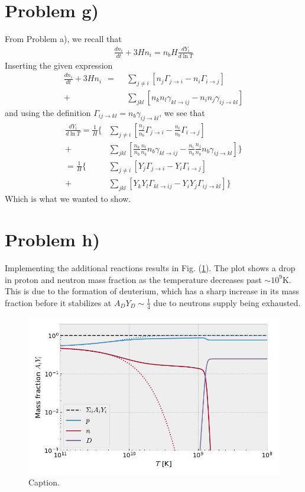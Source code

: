 \documentclass[reprint,english,notitlepage]{revtex4-1}  %
\numberwithin{equation}{section}
\begin{document}
\section{Problem g)}
From Problem a), we recall that
\begin{align}
	\frac{dn_i}{dt} + 3Hn_i = n_b H \frac{dY_i}{d\ln{T}}
\end{align}
Inserting the given expression
\begin{align}
	\frac{dn_i}{dt} + 3Hn_i
	\ \	=\ \ &\sum\limits_{j\neq i} [n_j\Gamma_{j\rightarrow i} - n_i\Gamma_{i\rightarrow j}] \\
		+ &\sum\limits_{jkl} [n_k n_l\gamma_{kl\rightarrow ij} - n_i n_j\gamma_{ij\rightarrow kl}]
\end{align}
and using the definition $\Gamma_{ij\rightarrow kl} = n_b \gamma_{ij\rightarrow kl}$,
we see that
\begin{align}
		  \frac{dY_i}{d\ln{T}}
		= \frac{1}{H}\bigg\{
		  &\sum\limits_{j\neq i} [\frac{n_j}{n_b}\Gamma_{j\rightarrow i} - \frac{n_i}{n_b}\Gamma_{i\rightarrow j}] \\
		+ &\sum\limits_{jkl} [\frac{n_k}{n_b}\frac{n_l}{n_b} n_b\gamma_{kl\rightarrow ij}
													- \frac{n_i}{n_b}\frac{n_j}{n_b} n_b\gamma_{ij\rightarrow kl}]
			\bigg\} \\
		= \frac{1}{H}\bigg\{
		  &\sum\limits_{j\neq i} [Y_j \Gamma_{j\rightarrow i} - Y_i \Gamma_{i\rightarrow j}] \\
		+ &\sum\limits_{jkl} [Y_k Y_l \Gamma_{kl\rightarrow ij}
													- Y_i Y_j \Gamma_{ij\rightarrow kl}]
			\bigg\}
\end{align}
Which is what we wanted to show.
\section{Problem h)}
Implementing the additional reactions results in Fig. (\ref{fig:problem_h}).
The plot shows a drop in proton and neutron mass fraction as the temperature
decreases past $\sim 10^9$K. This is due to the formation of deuterium, which
has a sharp increase in its mass fraction before it stabilizes at
$A_{D} Y_{D} \sim \frac{1}{4}$ due to neutrons supply being exhausted.
\begin{figure}[h]
	\includegraphics[width=\columnwidth]{densities_h.png}
	\caption{Caption.}
	\label{fig:problem_h}
\end{figure}
\end{document}
